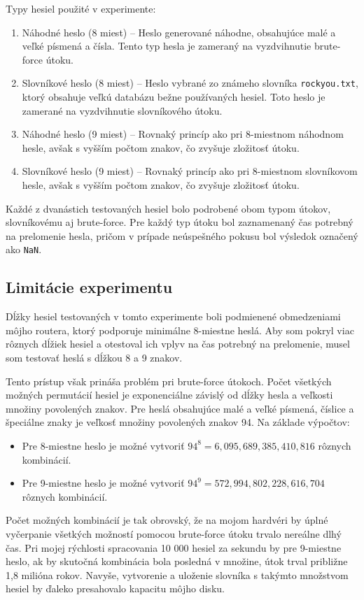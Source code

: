 \documentclass[12pt, twoside]{book}
\begin{document}
Typy hesiel použité v experimente:
\begin{enumerate} 
\item Náhodné heslo (8 miest) – Heslo generované náhodne, obsahujúce malé a veľké písmená a čísla. Tento typ hesla je zameraný na vyzdvihnutie brute-force útoku.
\item Slovníkové heslo (8 miest) – Heslo vybrané zo známeho slovníka \texttt{rockyou.txt}, ktorý obsahuje veľkú databázu bežne používaných hesiel. Toto heslo je zamerané na vyzdvihnutie slovníkového útoku. 
\item Náhodné heslo (9 miest) – Rovnaký princíp ako pri 8-miestnom náhodnom hesle, avšak s vyšším počtom znakov, čo zvyšuje zložitosť útoku. 
\item Slovníkové heslo (9 miest) – Rovnaký princíp ako pri 8-miestnom slovníkovom hesle, avšak s vyšším počtom znakov, čo zvyšuje zložitosť útoku.
 \end{enumerate}

Každé z  dvanástich testovaných hesiel bolo podrobené obom typom útokov, slovníkovému aj brute-force. Pre každý typ útoku bol zaznamenaný čas potrebný na prelomenie hesla, pričom v prípade neúspešného pokusu bol výsledok označený ako \texttt{NaN}.


\subsection{Limitácie experimentu}
Dĺžky hesiel testovaných v tomto experimente boli podmienené obmedzeniami môjho routera, ktorý podporuje minimálne 8-miestne heslá. Aby som pokryl viac rôznych dĺžiek hesiel a otestoval ich vplyv na čas potrebný na prelomenie, musel som testovať heslá s dĺžkou 8 a 9 znakov.

Tento prístup však prináša problém pri brute-force útokoch. Počet všetkých možných permutácií hesiel je exponenciálne závislý od dĺžky hesla a veľkosti množiny povolených znakov. Pre heslá obsahujúce malé a veľké písmená, číslice a špeciálne znaky je veľkosť množiny povolených znakov 94. Na základe výpočtov:

\begin{itemize} 
\item Pre 8-miestne heslo je možné vytvoriť $94^8 = 6,095,689,385,410,816$ rôznych kombinácií.
 \item Pre 9-miestne heslo je možné vytvoriť $94^9 = 572,994,802,228,616,704$ rôznych kombinácií. 
\end{itemize}

Počet možných kombinácií je tak obrovský, že na mojom hardvéri by úplné vyčerpanie všetkých možností pomocou brute-force útoku trvalo nereálne dlhý čas. Pri mojej rýchlosti spracovania 10 000 hesiel za sekundu by pre 9-miestne heslo, ak by skutočná kombinácia bola posledná v množine, útok trval približne 1,8 milióna rokov. Navyše, vytvorenie a uloženie slovníka s takýmto množstvom hesiel by ďaleko presahovalo kapacitu môjho disku.
\end{document}
